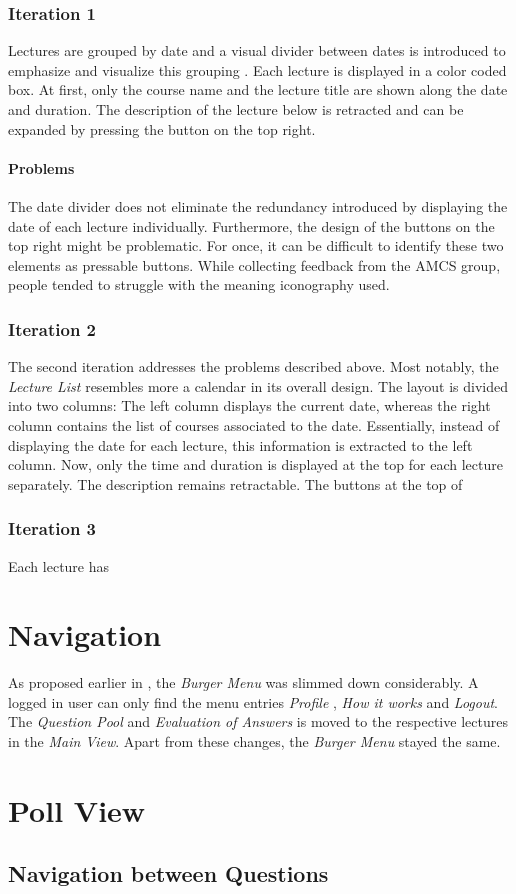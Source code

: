\subsubsection{Iteration 1}
Lectures are grouped by date and a visual divider between dates is introduced to emphasize and visualize this grouping \todogrf. Each lecture is displayed in a color coded box. At first, only the course name and the lecture title are shown along the date and duration. The description of the lecture below is retracted and can be expanded by pressing the button on the top right.
\paragraph{Problems}
The date divider does not eliminate the redundancy introduced by displaying the date of each lecture individually.
Furthermore, the design of the buttons on the top right might be problematic. For once, it can be difficult to identify these two elements as pressable buttons. While collecting feedback from the AMCS group, people tended to struggle with the meaning iconography used. 

\subsubsection{Iteration 2}
The second iteration addresses the problems described above. Most notably, the \emph{Lecture List} resembles more a calendar in its overall design. The layout is divided into two columns: The left column displays the current date, whereas the right column contains the list of courses associated to the date. Essentially, instead of displaying the date for each lecture, this information is extracted to the left column. Now, only the time and duration is displayed at the top for each lecture separately. The description remains retractable. The buttons at the top of 


\subsubsection{Iteration 3}
Each lecture has


\section{Navigation}
As proposed earlier in , the \emph{Burger Menu} was slimmed down considerably. A logged in user can only find the menu entries \emph{Profile}
, \emph{How it works} and \emph{Logout}.
The \emph{Question Pool} and \emph{Evaluation of Answers} is moved to the respective lectures in the \emph{Main View}. Apart from these changes, the \emph{Burger Menu} stayed the same.

\section{Poll View}


\subsection{Navigation between Questions}
